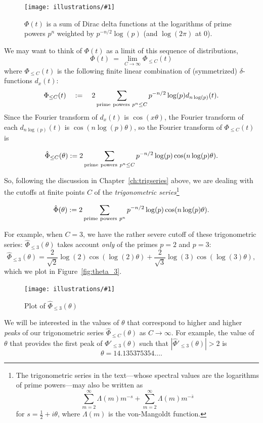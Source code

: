 \documentclass[openany]{book}
\newcommand{\ill}[3]{%
   \begin{figure}[H]%
   \vspace{-2ex}
   \centering%
   \texttt{[image: illustrations/\#1]}%
   \caption{#3}%
   \vspace{-2ex}
    \end{figure}}
\theoremstyle{plain}
\theoremstyle{definition}
\begin{document}
\ill{bigPhi}{1}{$\Phi(t)$ is a sum of Dirac delta functions at the logarithms of prime powers $p^n$ weighted by $p^{-n/2}\log(p)$ (and $\log(2\pi)$ at $0$).}


We may want to think of $\Phi(t)$ as a limit of this sequence of distributions,
 $$\Phi(t)\ = \ \lim_{C \to {\infty}}\Phi_{\le C}(t)$$
where $\Phi_{\le C}(t)$  is the following finite linear
combination of (symmetrized) $\delta$-functions  $d_x(t)$:
 $$\Phi_{\le C}(t)\quad :=\quad  2\sum_{{\rm prime\ powers \ }p^n  \le C} p^{-n/2}\log(p)d_{n\log(p)}(t).$$
 Since the Fourier transform of $d_x(t)$ is  $\cos(x\theta)$, the Fourier transform of  each $d_{n\log(p)}(t)$ is
 $\cos(n\log(p)\theta)$, so the Fourier transform of $\Phi_{\le
   C}(t)$ is

  $${\hat \Phi}_{\leq C}(\theta):= 2\sum_{{\rm prime\ powers\ }p^n  \leq{} C} p^{-n/2} \log(p)\cos(n\log(p)\theta).$$

   So, following the discussion in Chapter~\ref{ch:trigseries} above, we are dealing with the cutoffs at finite points  $C$  of the {\it trigonometric series}{\footnote{The trigonometric series in the text---whose spectral values are the logarithms of prime powers---may also be written as
   $$\sum_{m=2}^{\infty}\Lambda(m)m^{-s} + \sum_{m=2}^{\infty}\Lambda(m)m^{-{\bar s}}$$ for $s={\frac{1}{2}}+i\theta$, where  $\Lambda(m)$ is the von-Mangoldt function.}}

   $${\hat \Phi}(\theta):= 2\sum_{{\rm prime\ powers\ }p^n } p^{-n/2} \log(p)\cos(n\log(p)\theta).$$




For example, when $C=3$, we have the rather severe cutoff of these trigonometric series: ${\hat \Phi}_{\leq 3}(\theta)$ takes account {\it only} of the primes $p=2$ and $p=3$:
$$
  {\hat \Phi}_{\leq 3}(\theta) =
  \frac{2}{\sqrt{2}} \log(2)\cos(\log(2)\theta)
 +
 \frac{2}{\sqrt{3}} \log(3)\cos(\log(3)\theta),
$$
which we plot in Figure~\ref{fig:theta_3}.


\ill{theta_3_intro-1}{.85}{Plot of ${\hat \Phi}_{\leq 3}(\theta)$\label{fig:theta3}}


We will be interested in the values of $\theta$ that correspond to higher and higher {\it peaks} of our trigonometric series ${\hat \Phi}_{\leq C}(\theta)$ as $C\to \infty$. For example, the value of $\theta$ that provides the first peak of $
  {\hat \Phi'}_{\leq 3}(\theta)$ such that $
  |{\hat \Phi'}_{\leq 3}(\theta)| > 2$  is $$\theta=14.135375354\ldots.$$
\end{document}

